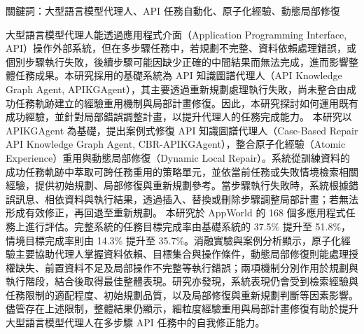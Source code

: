 \begin{ZhAbstract}
    \begin{ZhAbstractItems}
        \noindent \text 關鍵詞：大型語言模型代理人、API 任務自動化、原子化經驗、動態局部修復

    \end{ZhAbstractItems}

    \begin{ZhAbstractDescription}
        大型語言模型代理人能透過應用程式介面（Application Programming Interface, API）操作外部系統，但在多步驟任務中，若規劃不完整、資料依賴處理錯誤，或個別步驟執行失敗，後續步驟可能因缺少正確的中間結果而無法完成，進而影響整體任務成果。本研究採用的基礎系統為 API 知識圖譜代理人（API Knowledge Graph Agent, APIKGAgent），其主要透過重新規劃處理執行失敗，尚未整合由成功任務軌跡建立的經驗重用機制與局部計畫修復。因此，本研究探討如何運用既有成功經驗，並針對局部錯誤調整計畫，以提升代理人的任務完成能力。
        本研究以 APIKGAgent 為基礎，提出案例式修復 API 知識圖譜代理人（Case-Based Repair API Knowledge Graph Agent, CBR-APIKGAgent），整合原子化經驗（Atomic Experience）重用與動態局部修復（Dynamic Local Repair）。系統從訓練資料的成功任務軌跡中萃取可跨任務重用的策略單元，並依當前任務或失敗情境檢索相關經驗，提供初始規劃、局部修復與重新規劃參考。當步驟執行失敗時，系統根據錯誤訊息、相依資料與執行結果，透過插入、替換或刪除步驟調整局部計畫；若無法形成有效修正，再回退至重新規劃。
        本研究於 AppWorld 的 168 個多應用程式任務上進行評估。完整系統的任務目標完成率由基礎系統的 37.5\% 提升至 51.8\%，情境目標完成率則由 14.3\% 提升至 35.7\%。消融實驗與案例分析顯示，原子化經驗主要協助代理人掌握資料依賴、目標集合與操作條件，動態局部修復則能處理授權缺失、前置資料不足及局部操作不完整等執行錯誤；兩項機制分別作用於規劃與執行階段，結合後取得最佳整體表現。研究亦發現，系統表現仍會受到檢索經驗與任務限制的適配程度、初始規劃品質，以及局部修復與重新規劃判斷等因素影響。儘管存在上述限制，整體結果仍顯示，細粒度經驗重用與局部計畫修復有助於提升大型語言模型代理人在多步驟 API 任務中的自我修正能力。
    \end{ZhAbstractDescription}
    
\end{ZhAbstract}
